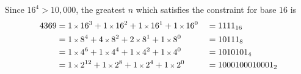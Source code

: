 Since $16^{4}>10,000$, the greatest $n$ which satisfies the constraint for base $16$ is
\begin{alignat*}{2}
4369 
 & = 1 \mult 16^{3} + 1 \mult 16^{2} + 1 \mult 16^{1} + 1 \mult 16^{0}
 && = 1111_{16}
\\
 & = 1 \mult 8^{4} + 4 \mult 8^{2} + 2 \mult 8^{1} + 1 \mult 8^{0}
 && = 10111_{8}
\\
 & = 1 \mult 4^{6} + 1 \mult 4^{4} + 1 \mult 4^{2} + 1 \mult 4^{0} 
 && = 1010101_{4}
\\
 & = 1 \mult 2^{12} + 1 \mult 2^{8} + 1 \mult 2^{4} + 1 \mult 2^{0}
 && = 1000100010001_{2}
\end{alignat*}
